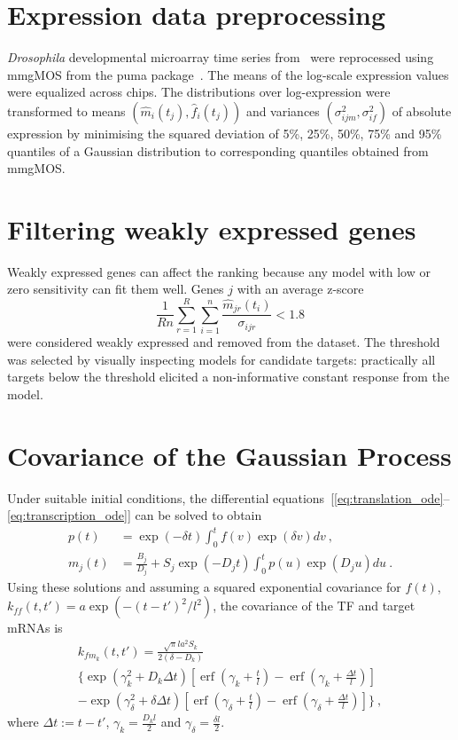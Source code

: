 \documentclass{pnastwo}
\newcommand{\erf}{\operatorname{erf}}
\begin{document}
\begin{article}
\begin{materials}
  \section{Expression data preprocessing} {\it Drosophila} developmental
  microarray time series from~\cite{Tomancak2002} were reprocessed
  using mmgMOS from the puma package~\cite{Pearson2009}.  The means of
  the log-scale expression values were equalized across chips.  The
  distributions over log-expression were transformed to means
  $\left(\hat{m}_i(t_j), \hat{f}_i(t_j)\right)$ and variances $\left(\sigma_{ijm}^2,
  \sigma_{if}^2 \right)$ of absolute expression by minimising the squared
  deviation of 5\%, 25\%, 50\%, 75\% and 95\% quantiles of a Gaussian
  distribution to corresponding quantiles obtained from mmgMOS.

  \section{Filtering weakly expressed genes}
  Weakly expressed genes can affect the ranking because any model
  with low or zero sensitivity can fit them
  well. Genes $j$ with an average z-score 
  $$ \frac{1}{Rn} \sum_{r=1}^R \sum_{i=1}^n \frac{\hat{m}_{jr}(t_i)}{\sigma_{ijr}} < 1.8 $$
  were considered weakly expressed and removed from the dataset.  The threshold
  was selected by visually inspecting models for candidate targets:
  practically all targets below the threshold elicited a
  non-informative constant response from the model.
  
  \section{Covariance of the Gaussian Process}
  Under suitable initial conditions, the differential
  equations~[\ref{eq:translation_ode}--\ref{eq:transcription_ode}]
  can be solved to obtain
  \begin{align*}
    p(t) &= \exp(-\delta t) \int_0^t f(v) \exp(\delta v) dv\ , \\
    m_j(t) &= \frac{B_j}{D_j} + S_j \exp(-D_j t) \int_0^t p(u)
    \exp(D_j u) du\ .
  \end{align*}
  Using these solutions and assuming a squared exponential covariance
  for $f(t)$, $k_{ff}(t, t') = a \exp( -(t-t')^2/l^2)$, the covariance
  of the TF and target mRNAs is
  \begin{multline*}
    k_{f m_k}(t, t')
    = \frac{\sqrt{\pi} l a^2 S_k}{2(\delta - D_k)} \\
    \bigg\{
    \exp\left(\gamma_k^2 + D_k \Delta t \right)
    \left[\erf\left(\gamma_k + \frac{t}{l}\right) 
      - \erf\left(\gamma_k + \frac{\Delta t}{l}\right)\right] \\
    -
    \exp\left(\gamma_\delta^2 + \delta \Delta t\right)
    \left[\erf\left(\gamma_\delta + \frac{t}{l}\right) 
      - \erf\left(\gamma_\delta + \frac{\Delta t}{l}\right)\right]
    \bigg\}\ ,
  \end{multline*}
  where $\Delta t := t - t'$, $\gamma_k = \frac{D_k l}{2}$
  and $\gamma_\delta = \frac{\delta l}{2}$.


\end{materials}
\end{article}
\end{document}

